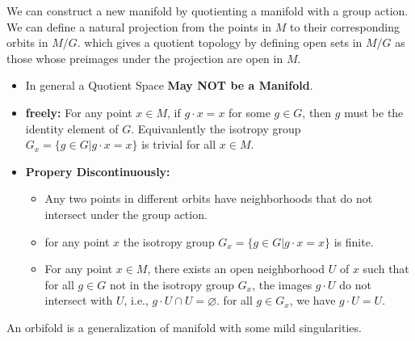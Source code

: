 We can construct a new manifold by quotienting a manifold with a group action.
We can define a natural projection from the points in \( M \) to their corresponding orbits in \( M/G \). which gives a quotient topology by defining open sets in \( M/G \) as those whose preimages under the projection are open in \( M \).
\begin{itemize}
  \item In general a Quotient Space \textbf{May NOT be a Manifold}.
\end{itemize}
\begin{itemize}
  \item \textbf{freely:} For any point \( x \in M \), if \( g \cdot x = x \) for some \( g \in G \), then \( g \) must be the identity element of \( G \). Equivanlently the isotropy group \( G_x = \{g \in G | g \cdot x = x\} \) is trivial for all \( x \in M \).
  \item \textbf{Propery Discontinuously:} 
    \begin{itemize}
      \item Any two points in different orbits have neighborhoods that do not intersect under the group action. 
      \item for any point $ x $ the isotropy group $ G_x=\{g\in G|g\cdot x=x\} $ is finite. 
        \item For any point $ x\in M $, there exists an open neighborhood $ U $ of $ x $ such that for all $ g\in G $ not in the isotropy group $ G_x $, the images $ g\cdot U $ do not intersect with $ U $, i.e., $ g\cdot U\cap U=\varnothing $. for all $ g \in G_x $, we have $ g\cdot U=U $.
    \end{itemize}
\end{itemize}
An orbifold is a generalization of manifold with some mild singularities.

